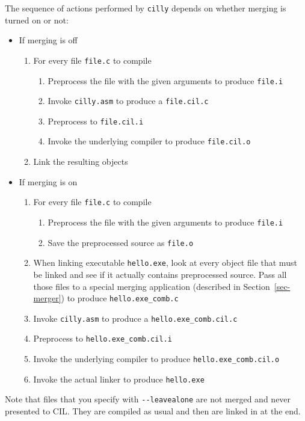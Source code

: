\documentclass{article}
\def\secref#1{Section~\ref{sec-#1}}
\def\t#1{{\tt #1}}
\begin{document}
 The sequence of actions performed by \t{cilly} depends on whether merging
is turned on or not:
\begin{itemize}
\item If merging is off
  \begin{enumerate}
    \item For every file \t{file.c} to compile
         \begin{enumerate}
            \item Preprocess the file with the given arguments to 
                  produce \t{file.i}
            \item Invoke \t{cilly.asm} to produce a \t{file.cil.c}
            \item Preprocess to \t{file.cil.i}
            \item Invoke the underlying compiler to produce \t{file.cil.o}
         \end{enumerate}
    \item Link the resulting objects
  \end{enumerate}
\item If merging is on
  \begin{enumerate}
    \item For every file \t{file.c} to compile
         \begin{enumerate}
            \item Preprocess the file with the given arguments to 
                  produce \t{file.i}
            \item Save the preprocessed source as \t{file.o}
         \end{enumerate}
    \item When linking executable \t{hello.exe}, look at every object 
          file that must be linked and see if it actually 
          contains preprocessed source. Pass all those files to a 
          special merging application (described in
          \secref{merger}) to produce \t{hello.exe\_comb.c}
    \item Invoke \t{cilly.asm} to produce a \t{hello.exe\_comb.cil.c}
    \item Preprocess to \t{hello.exe\_comb.cil.i}
    \item Invoke the underlying compiler to produce \t{hello.exe\_comb.cil.o}
    \item Invoke the actual linker to produce \t{hello.exe}
  \end{enumerate}
\end{itemize}

 Note that files that you specify with \t{-{}-leavealone} are not merged and
never presented to CIL. They are compiled as usual and then are linked in at
the end. 
\end{document}
